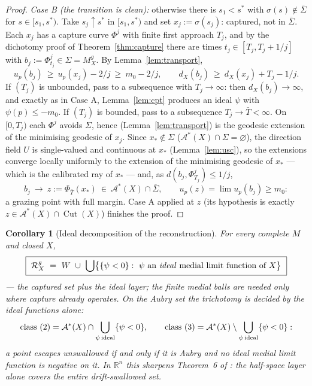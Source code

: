 \documentclass[11pt]{article}
\newtheorem{corollary}[theorem]{Corollary}
\theoremstyle{remark}
\newcommand{\R}{\mathbb{R}}
\newcommand{\X}{X}
\newcommand{\Mg}{M^{g}_{\X}}
\newcommand{\Rg}{\mathcal{R}^{g}_{\X}}
\newcommand{\dX}{d_{\X}}
\newcommand{\Cut}{\operatorname{Cut}}
\newcommand{\Aub}{\mathcal{A}^{\ast}}
\begin{document}
\begin{proof}
\emph{Case B (the transition is clean):} otherwise there is
$s_{1}<s^{\ast}$ with $\sigma(s)\notin\overline{\Sigma}$ for
$s\in[s_{1},s^{\ast})$. Take $s_{j}\uparrow s^{\ast}$ in
$[s_{1},s^{\ast})$ and set $x_{j}:=\sigma(s_{j})$: captured, not in
$\overline{\Sigma}$. Each $x_{j}$ has a capture curve $\Phi^{j}$
with finite first approach $T_{j}$, and by the dichotomy proof of
Theorem~\ref{thm:capture} there are times
$t_{j}\in[T_{j},T_{j}+1/j]$ with
$b_{j}:=\Phi^{j}_{t_{j}}\in\Sigma=\Mg$. By
Lemma~\ref{lem:transport},
\[
  u_{p}(b_{j})\ \ge\ u_{p}(x_{j})-2/j\ \ge\ m_{0}-2/j,
  \qquad
  \dX(b_{j})\ \ge\ \dX(x_{j})+T_{j}-1/j .
\]
If $(T_{j})$ is unbounded, pass to a subsequence with
$T_{j}\to\infty$: then $\dX(b_{j})\to\infty$, and exactly as in Case
A, Lemma~\ref{lem:cpt} produces an ideal $\psi$ with
$\psi(p)\le-m_{0}$. If $(T_{j})$ is bounded, pass to a subsequence
$T_{j}\to\bar T<\infty$. On $[0,T_{j})$ each $\Phi^{j}$ avoids
$\Sigma$, hence (Lemma~\ref{lem:transport}) is the geodesic
extension of the minimising geodesic of $x_{j}$. Since
$x_{\ast}\notin\Sigma$ ($\Aub(\X)\cap\Sigma=\varnothing$), the
direction field $U$ is single-valued and continuous at $x_{\ast}$
(Lemma~\ref{lem:usc}), so the extensions converge locally uniformly
to the extension of the minimising geodesic of $x_{\ast}$ --- which
is the calibrated ray of $x_{\ast}$ --- and, as
$d(b_{j},\Phi^{j}_{T_{j}})\le1/j$,
\[
  b_{j}\ \longrightarrow\
  z:=\Phi_{\bar T}(x_{\ast})
  \ \in\ \Aub(\X)\cap\overline{\Sigma},
  \qquad
  u_{p}(z)=\lim u_{p}(b_{j})\ge m_{0} :
\]
a grazing point with full margin. Case A applied at $z$ (its
hypothesis is exactly $z\in\Aub(\X)\cap\Cut(\X)$) finishes the
proof.
\end{proof}

\begin{corollary}[Ideal decomposition of the reconstruction]
\label{cor:idealdecomp}
For every complete $M$ and closed $\X$,
\[
  \boxed{\ \Rg\ =\ W\ \cup\ \bigcup\bigl\{\{\psi<0\}:\ \psi\
  \text{an \emph{ideal} medial limit function of }\X\bigr\}\ }
\]
--- the captured set plus the ideal layer; the finite medial balls
are needed only where capture already operates. On the Aubry set the
trichotomy is decided by the ideal functions alone:
\[
  \textup{class (2)}=\Aub(\X)\cap\bigcup_{\psi\,\mathrm{ideal}}
  \{\psi<0\},
  \qquad
  \textup{class (3)}=\Aub(\X)\setminus\bigcup_{\psi\,\mathrm{ideal}}
  \{\psi<0\} :
\]
a point escapes unswallowed if and only if it is Aubry and no ideal
medial limit function is negative on it. In $\R^{n}$ this sharpens
Theorem~6 of \cite{Bia}: the half-space layer alone covers the
entire drift-swallowed set.
\end{corollary}
\end{document}
